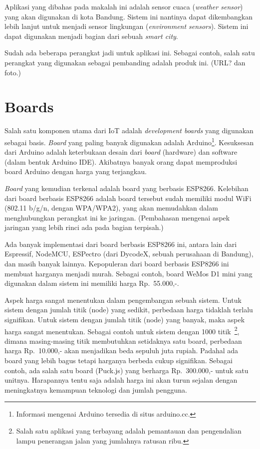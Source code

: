 \documentclass[
10pt, %
a4paper, %
oneside, %
headinclude,footinclude, %
BCOR5mm, %
]{scrartcl}
\begin{document}
Aplikasi yang dibahas pada makalah ini adalah sensor cuaca ({\em weather
sensor}) yang akan digunakan di kota Bandung. Sistem ini nantinya dapat
dikembangkan lebih lanjut untuk menjadi sensor lingkungan ({\em environment
sensors}). Sistem ini dapat digunakan menjadi bagian dari sebuah {\em smart
city}.

Sudah ada beberapa perangkat jadi untuk aplikasi ini. Sebagai contoh, salah
satu perangkat yang digunakan sebagai pembanding adalah produk ini. (URL? dan
foto.)

\section{Boards}
Salah satu komponen utama dari IoT adalah {\em development boards} yang
digunakan sebagai basis. {\em Board} yang paling banyak digunakan adalah
Arduino\footnote{Informasi mengenai Arduino tersedia di situs arduino.cc.}.
Kesuksesan dari Arduino adalah keterbukaan desain dari {\em board} (hardware)
dan software (dalam bentuk Arduino IDE). Akibatnya banyak orang dapat
memproduksi board Arduino dengan harga yang terjangkau.

{\em Board} yang kemudian terkenal adalah board yang berbasis ESP8266.
Kelebihan dari board berbasis ESP8266 adalah board tersebut sudah memiliki
modul WiFi (802.11 b/g/n, dengan WPA/WPA2), yang akan memudahkan dalam
menghubungkan perangkat ini ke jaringan.  (Pembahasan mengenai aspek jaringan
yang lebih rinci ada pada bagian terpisah.)

Ada banyak implementasi dari board berbasis ESP8266 ini, antara lain dari
Espressif, NodeMCU, ESPectro (dari DycodeX, sebuah perusahaan di Bandung), dan
masih banyak lainnya. Kepopuleran dari board berbasis ESP8266 ini membuat
harganya menjadi murah. Sebagai contoh, board WeMos D1 mini yang digunakan
dalam sistem ini memiliki harga Rp.~55.000,-.

Aspek harga sangat menentukan dalam pengembangan sebuah sistem. Untuk sistem
dengan jumlah titik (node) yang sedikit, perbedaan harga tidaklah terlalu
signifikan. Untuk sistem dengan jumlah titik (node) yang banyak, maka aspek
harga sangat menentukan. Sebagai contoh untuk sistem dengan 1000
titik~\footnote{Salah satu aplikasi yang terbayang adalah pemantauan dan
pengendalian lampu penerangan jalan yang jumlahnya ratusan ribu.}, dimana
masing-masing titik membutuhkan setidaknya satu board, perbedaan harga
Rp.~10.000,- akan menjadikan beda sepuluh juta rupiah. Padahal ada board yang
lebih bagus tetapi harganya berbeda cukup signifikan. Sebagai contoh, ada salah
satu board (Puck.js) yang berharga Rp.~300.000,- untuk satu unitnya. Harapannya
tentu saja adalah harga ini akan turun sejalan dengan meningkatnya kemampuan
teknologi dan jumlah pengguna.
\end{document}
